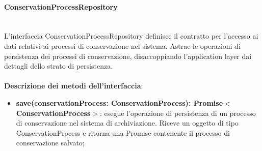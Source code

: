 \documentclass[a4paper,12pt]{article}
\begin{document}

                \paragraph{ConservationProcessRepository}\label{par:ConservationProcessRepository}\mbox{}\\
                L'interfaccia ConservationProcessRepository definisce il contratto per l'accesso ai dati relativi ai processi di conservazione nel sistema. Astrae le operazioni di persistenza dei processi di conservazione, disaccoppiando l'application layer dai dettagli dello strato di persistenza.\\
                \\
              \noindent \textbf{Descrizione dei metodi dell'interfaccia}:
                \begin{itemize}
                    \item \textbf{save(conservationProcess: ConservationProcess): Promise$<$ConservationProcess$>$}: esegue l'operazione di persistenza di un processo di conservazione nel sistema di archiviazione. Riceve un oggetto di tipo ConservationProcess e ritorna una Promise contenente il processo di conservazione salvato;
                \end{itemize}
\end{document}
